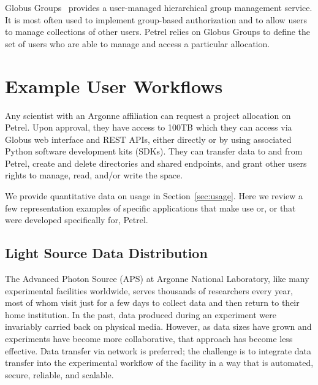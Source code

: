 \documentclass[sigconf]{acmart}
\begin{document}
Globus Groups~\cite{chard16nexus} provides a user-managed hierarchical group management service. 
It is most often used to implement group-based authorization and to allow
users to manage collections of other users. Petrel relies on Globus
Groups to define the set of users who are able to manage and access
a particular allocation.

\section{Example User Workflows}

Any scientist with an Argonne affiliation can request a project allocation on Petrel. 
Upon approval, they have access to 100TB which they can access via Globus
web interface and REST APIs, either directly or by using associated Python software development kits (SDKs).
They can transfer data to and from Petrel, create and delete directories and shared endpoints,
and grant other users rights to manage, read, and/or write the space.

We provide quantitative data on usage in Section~\ref{sec:usage}.
Here we review a few representation examples of specific applications that make use or,
or that were developed specifically for, Petrel. 


%
%

\subsection{Light Source Data Distribution}

The Advanced Photon Source (APS) at Argonne National Laboratory, like many experimental facilities
worldwide, 
serves thousands of researchers every year, 
most of whom visit just for a few days to collect data and then return to their home institution.
In the past, data produced during an experiment were invariably carried back on physical media.
However, as data sizes have grown and experiments have become more collaborative,
that approach has become less effective.
Data transfer via network is preferred;
the challenge is to integrate data transfer into the experimental workflow of the facility
in a way that is automated, secure, reliable, and scalable. %
\end{document}
